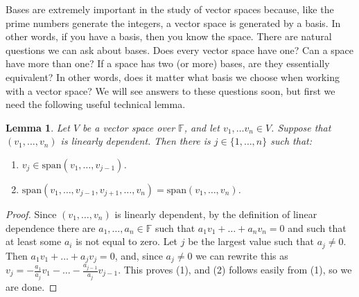\documentclass{article}
\theoremstyle{plain}
\newtheorem{lemma}[theorem]{Lemma}{\bfseries}{\upshape}
\newcommand{\bF}{\mathbb{F}}
\newcommand{\spa}{\mathrm{span}}
\begin{document}
Bases are extremely important in the study of vector spaces because, like the prime numbers generate the integers, a vector space is generated by a basis. In other words, if you have a basis, then you know the space. There are natural questions we can ask about bases. Does every vector space have one? Can a space have more than one? If a space has two (or more) bases, are they essentially equivalent? In other words, does it matter what basis we choose when working with a vector space? We will see answers to these questions soon, but first we need the following useful technical lemma.

\begin{lemma}\label{L:LA2tech}
Let $V$ be a vector space over $\bF$, and let $v_1,\ldots v_n\in V$. Suppose that $(v_1,\ldots,v_n)$ is linearly dependent. Then there is $j\in\{1,\ldots,n\}$ such that:
\begin{enumerate}
\item $v_j \in \spa(v_1,\ldots,v_{j-1})$.
\item $\spa(v_1,\ldots , v_{j-1}, v_{j+1},\ldots, v_n) = \spa(v_1,\ldots,v_n)$.
\end{enumerate} 
\end{lemma}
\begin{proof}
Since $(v_1,\ldots,v_n)$ is linearly dependent, by the definition of linear dependence there are $a_1,\ldots,a_n\in \bF$ such that $a_1v_1+\ldots + a_nv_n = 0$ and such that at least some $a_i$ is not equal to zero. Let $j$ be the largest value such that $a_j\neq 0$. Then $a_1v_1 + \ldots +a_j v_j = 0$, and, since $a_j\neq 0$ we can rewrite this as $v_j = -\frac{a_1}{a_j}v_1-\ldots -\frac{a_{j-1}}{a_j}v_{j-1}$. This proves (1), and (2) follows easily from (1), so we are done. 
\end{proof}
\end{document}

